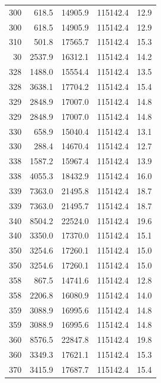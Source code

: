 \begin{longtable}{rrrrr}
    300 & \num{618.5} & \num{14905.9} & \num{115142.4} & 12.9 \\
    300 & \num{618.5} & \num{14905.9} & \num{115142.4} & 12.9 \\
    310 & \num{501.8} & \num{17565.7} & \num{115142.4} & 15.3 \\
    30 & \num{2537.9} & \num{16312.1} & \num{115142.4} & 14.2 \\
    328 & \num{1488.0} & \num{15554.4} & \num{115142.4} & 13.5 \\
    328 & \num{3638.1} & \num{17704.2} & \num{115142.4} & 15.4 \\
    329 & \num{2848.9} & \num{17007.0} & \num{115142.4} & 14.8 \\
    329 & \num{2848.9} & \num{17007.0} & \num{115142.4} & 14.8 \\
    330 & \num{658.9} & \num{15040.4} & \num{115142.4} & 13.1 \\
    330 & \num{288.4} & \num{14670.4} & \num{115142.4} & 12.7 \\
    338 & \num{1587.2} & \num{15967.4} & \num{115142.4} & 13.9 \\
    338 & \num{4055.3} & \num{18432.9} & \num{115142.4} & 16.0 \\
    339 & \num{7363.0} & \num{21495.8} & \num{115142.4} & 18.7 \\
    339 & \num{7363.0} & \num{21495.7} & \num{115142.4} & 18.7 \\
    340 & \num{8504.2} & \num{22524.0} & \num{115142.4} & 19.6 \\
    340 & \num{3350.0} & \num{17370.0} & \num{115142.4} & 15.1 \\
    350 & \num{3254.6} & \num{17260.1} & \num{115142.4} & 15.0 \\
    350 & \num{3254.6} & \num{17260.1} & \num{115142.4} & 15.0 \\
    358 & \num{867.5} & \num{14741.6} & \num{115142.4} & 12.8 \\
    358 & \num{2206.8} & \num{16080.9} & \num{115142.4} & 14.0 \\
    359 & \num{3088.9} & \num{16995.6} & \num{115142.4} & 14.8 \\
    359 & \num{3088.9} & \num{16995.6} & \num{115142.4} & 14.8 \\
    360 & \num{8576.5} & \num{22847.8} & \num{115142.4} & 19.8 \\
    360 & \num{3349.3} & \num{17621.1} & \num{115142.4} & 15.3 \\
    370 & \num{3415.9} & \num{17687.7} & \num{115142.4} & 15.4 \\

\end{longtable}
